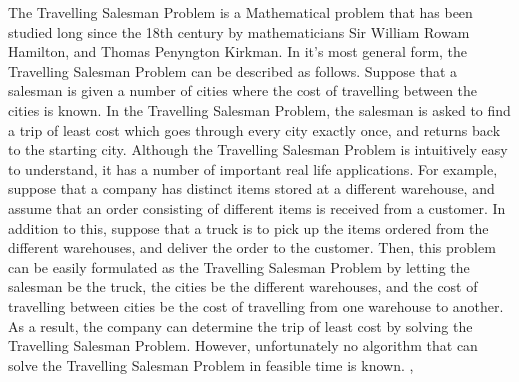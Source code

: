 \documentclass[12pt]{article}
\numberwithin{equation}{subsection}
\numberwithin{table}{subsection}
\numberwithin{algorithm}{subsection}
\numberwithin{figure}{subsection}
\begin{document}
The Travelling Salesman Problem is a Mathematical problem that has been studied long since the 18th century by mathematicians Sir William Rowam Hamilton, and Thomas Penyngton Kirkman. In it's most general form, the Travelling Salesman Problem can be described as follows. Suppose that a salesman is given a number of cities where the cost of travelling between the cities is known. In the Travelling Salesman Problem, the salesman is asked to find a trip of least cost which goes through every city exactly once, and returns back to the starting city. Although the Travelling Salesman Problem is intuitively easy to understand, it has a number of important real life applications. For example, suppose that a company has distinct items stored at a different warehouse, and assume that an order consisting of different items is received from a customer. In addition to this, suppose that a truck is to pick up the items ordered from the different warehouses, and deliver the order to the customer. Then, this problem can be easily formulated as the Travelling Salesman Problem by letting the salesman be the truck, the cities be the different warehouses, and the cost of travelling between cities be the cost of travelling from one warehouse to another. As a result, the company can determine the trip of least cost by solving the Travelling Salesman Problem. However,  unfortunately no algorithm that can solve the Travelling Salesman Problem in feasible time is known. \cite{dorigo_stutzle_thomas_2004}, \cite{Matai10}\\\\
\end{document}
